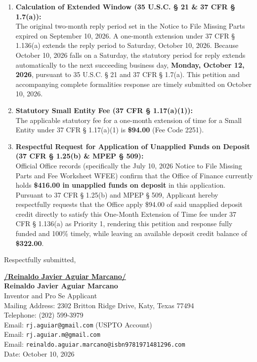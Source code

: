 \documentclass[11pt,letterpaper]{article}
\begin{document}
\begin{enumerate}[leftmargin=*]
    \item \textbf{Calculation of Extended Window (35 U.S.C. \S{} 21 \& 37 CFR \S{} 1.7(a)):} \\
    The original two-month reply period set in the Notice to File Missing Parts expired on September 10, 2026. A one-month extension under 37 CFR \S{} 1.136(a) extends the reply period to Saturday, October 10, 2026. Because October 10, 2026 falls on a Saturday, the statutory period for reply extends automatically to the next succeeding business day, \textbf{Monday, October 12, 2026}, pursuant to 35 U.S.C. \S{} 21 and 37 CFR \S{} 1.7(a). This petition and accompanying complete formalities response are timely submitted on October 10, 2026.

    \item \textbf{Statutory Small Entity Fee (37 CFR \S{} 1.17(a)(1)):} \\
    The applicable statutory fee for a one-month extension of time for a Small Entity under 37 CFR \S{} 1.17(a)(1) is \textbf{\$94.00} (Fee Code 2251).

    \item \textbf{Respectful Request for Application of Unapplied Funds on Deposit (37 CFR \S{} 1.25(b) \& MPEP \S{} 509):} \\
    Official Office records (specifically the July 10, 2026 Notice to File Missing Parts and Fee Worksheet WFEE) confirm that the Office of Finance currently holds \textbf{\$416.00 in unapplied funds on deposit} in this application. Pursuant to 37 CFR \S{} 1.25(b) and MPEP \S{} 509, Applicant hereby respectfully requests that the Office apply \$94.00 of said unapplied deposit credit directly to satisfy this One-Month Extension of Time fee under 37 CFR \S{} 1.136(a) as Priority 1, rendering this petition and response fully funded and 100\% timely, while leaving an available deposit credit balance of \textbf{\$322.00}.
\end{enumerate}

\vspace{0.6cm}
\begin{singlespace}
\noindent Respectfully submitted, \par\vspace{0.8cm}
\underline{\textbf{/Reinaldo Javier Aguiar Marcano/}} \\
\textbf{Reinaldo Javier Aguiar Marcano} \\
Inventor and Pro Se Applicant \\
Mailing Address: 2302 Britton Ridge Drive, Katy, Texas 77494 \\
Telephone: (202) 599-3979 \\
Email: \texttt{rj.aguiar@gmail.com} (USPTO Account) \\
Email: \texttt{rj.aguiar.m@gmail.com} \\
Email: \texttt{reinaldo.aguiar.marcano@isbn9781971481296.com} \\
Date: October 10, 2026
\end{singlespace}
\end{document}
